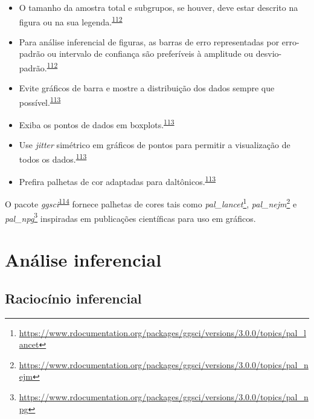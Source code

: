 \documentclass[
  a4paper,
]{book}
\renewcommand{\href}[2]{#2\footnote{\url{#1}}}
\newenvironment{infobox}[1]
  {
  \begin{itemize}
  \renewcommand{\labelitemi}{
    \raisebox{-.7\height}[0pt][0pt]{
      {\setkeys{Gin}{width=3em,keepaspectratio}
        \texttt{[image: \#1]}}
    }
  }
  \setlength{\fboxsep}{1em}
  \begin{blackbox}
  \item
  }
  {
  \end{blackbox}
  \end{itemize}
  }
\begin{document}
\begin{itemize}
\item
  O tamanho da amostra total e subgrupos, se houver, deve estar descrito na figura ou na sua legenda.\textsuperscript{\protect\hyperlink{ref-Cumming2007}{112}}
\item
  Para análise inferencial de figuras, as barras de erro representadas por erro-padrão ou intervalo de confiança são preferíveis à amplitude ou desvio-padrão.\textsuperscript{\protect\hyperlink{ref-Cumming2007}{112}}
\item
  Evite gráficos de barra e mostre a distribuição dos dados sempre que possível.\textsuperscript{\protect\hyperlink{ref-Weissgerber2019}{113}}
\item
  Exiba os pontos de dados em boxplots.\textsuperscript{\protect\hyperlink{ref-Weissgerber2019}{113}}
\item
  Use \emph{jitter} simétrico em gráficos de pontos para permitir a visualização de todos os dados.\textsuperscript{\protect\hyperlink{ref-Weissgerber2019}{113}}
\item
  Prefira palhetas de cor adaptadas para daltônicos.\textsuperscript{\protect\hyperlink{ref-Weissgerber2019}{113}}
\end{itemize}

\begin{infobox}{images/Rlogo}
O pacote \emph{ggsci}\textsuperscript{\protect\hyperlink{ref-ggsci}{114}} fornece palhetas de cores tais como \href{https://www.rdocumentation.org/packages/ggsci/versions/3.0.0/topics/pal_lancet}{\emph{pal\_lancet}}, \href{https://www.rdocumentation.org/packages/ggsci/versions/3.0.0/topics/pal_nejm}{\emph{pal\_nejm}} e \href{https://www.rdocumentation.org/packages/ggsci/versions/3.0.0/topics/pal_npg}{\emph{pal\_npg}} inspiradas em publicações científicas para uso em gráficos.

\end{infobox}

\hypertarget{analise-inferencial}{%
\chapter{\texorpdfstring{\textbf{Análise inferencial}}{Análise inferencial}}\label{analise-inferencial}}

\hypertarget{raciocinio-inferencial}{%
\section{Raciocínio inferencial}\label{raciocinio-inferencial}}
\end{document}
